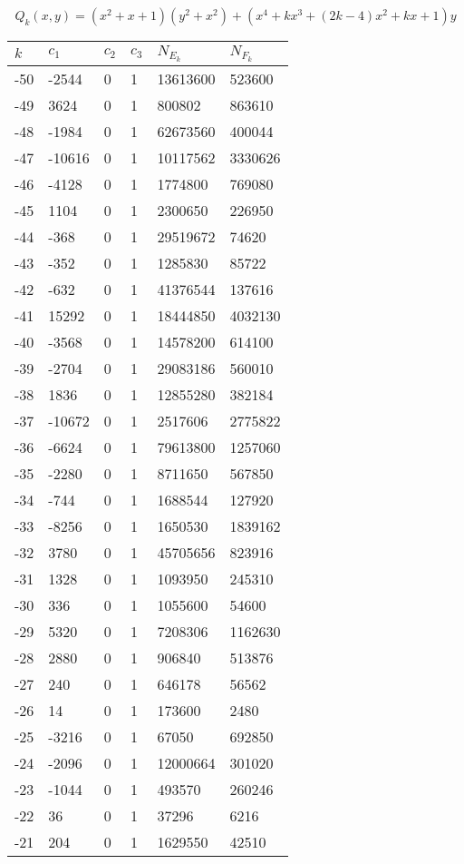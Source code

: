 \documentclass{amsart}
\begin{document}
\clearpage
$$Q_k(x,y)=(x^2 + x + 1)(y^2+x^2) + (x^4 + kx^3 + (2k - 4)x^2 + kx + 1)y$$
\begin{longtable}{llllll}
\hline
$k$ & $c_1$ & $c_2$ & $c_3$ & $N_{E_k}$ & $N_{F_k}$\\
\hline
-50 & -2544 & 0 & 1 & 13613600 & 523600\\
-49 & 3624 & 0 & 1 & 800802 & 863610\\
-48 & -1984 & 0 & 1 & 62673560 & 400044\\
-47 & -10616 & 0 & 1 & 10117562 & 3330626\\
-46 & -4128 & 0 & 1 & 1774800 & 769080\\
-45 & 1104 & 0 & 1 & 2300650 & 226950\\
-44 & -368 & 0 & 1 & 29519672 & 74620\\
-43 & -352 & 0 & 1 & 1285830 & 85722\\
-42 & -632 & 0 & 1 & 41376544 & 137616\\
-41 & 15292 & 0 & 1 & 18444850 & 4032130\\
-40 & -3568 & 0 & 1 & 14578200 & 614100\\
-39 & -2704 & 0 & 1 & 29083186 & 560010\\
-38 & 1836 & 0 & 1 & 12855280 & 382184\\
-37 & -10672 & 0 & 1 & 2517606 & 2775822\\
-36 & -6624 & 0 & 1 & 79613800 & 1257060\\
-35 & -2280 & 0 & 1 & 8711650 & 567850\\
-34 & -744 & 0 & 1 & 1688544 & 127920\\
-33 & -8256 & 0 & 1 & 1650530 & 1839162\\
-32 & 3780 & 0 & 1 & 45705656 & 823916\\
-31 & 1328 & 0 & 1 & 1093950 & 245310\\
-30 & 336 & 0 & 1 & 1055600 & 54600\\
-29 & 5320 & 0 & 1 & 7208306 & 1162630\\
-28 & 2880 & 0 & 1 & 906840 & 513876\\
-27 & 240 & 0 & 1 & 646178 & 56562\\
-26 & 14 & 0 & 1 & 173600 & 2480\\
-25 & -3216 & 0 & 1 & 67050 & 692850\\
-24 & -2096 & 0 & 1 & 12000664 & 301020\\
-23 & -1044 & 0 & 1 & 493570 & 260246\\
-22 & 36 & 0 & 1 & 37296 & 6216\\
-21 & 204 & 0 & 1 & 1629550 & 42510\\

\end{longtable}
\end{document}
